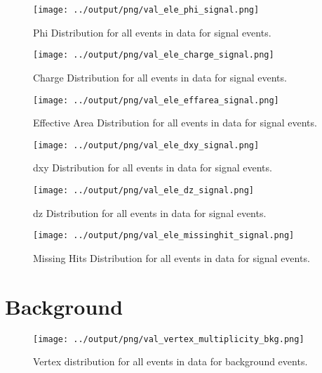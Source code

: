 \documentclass[11pt]{book}
\begin{document}
\begin{figure}[htb]
\centering
\texttt{[image: ../output/png/val\_ele\_phi\_signal.png]}
\caption{Phi Distribution for all events in data for signal events.}
\label{fig:val_ele_phi_signal}
\end{figure}

\begin{figure}[htb]
\centering
\texttt{[image: ../output/png/val\_ele\_charge\_signal.png]}
\caption{Charge Distribution for all events in data for signal events.}
\label{fig:val_ele_charge_signal}
\end{figure}

\begin{figure}[htb]
\centering
\texttt{[image: ../output/png/val\_ele\_effarea\_signal.png]}
\caption{Effective Area Distribution for all events in data for signal events.}
\label{fig:val_ele_effarea_signal}
\end{figure}

\begin{figure}[htb]
\centering
\texttt{[image: ../output/png/val\_ele\_dxy\_signal.png]}
\caption{dxy Distribution for all events in data for signal events.}
\label{fig:val_ele_dxy_signal}
\end{figure}

\begin{figure}[htb]
\centering
\texttt{[image: ../output/png/val\_ele\_dz\_signal.png]}
\caption{dz Distribution for all events in data for signal events.}
\label{fig:val_ele_dz_signal}
\end{figure}

\begin{figure}[htb]
\centering
\texttt{[image: ../output/png/val\_ele\_missinghit\_signal.png]}
\caption{Missing Hits Distribution for all events in data for signal events.}
\label{fig:val_ele_missinghit_signal}
\end{figure}
\clearpage


\section{Background}
\begin{figure}[htb]
\centering
\texttt{[image: ../output/png/val\_vertex\_multiplicity\_bkg.png]}
\caption{Vertex distribution for all events in data for background events.}
\label{fig:val_vertex_multiplicity_bkg}
\end{figure}
\end{document}
